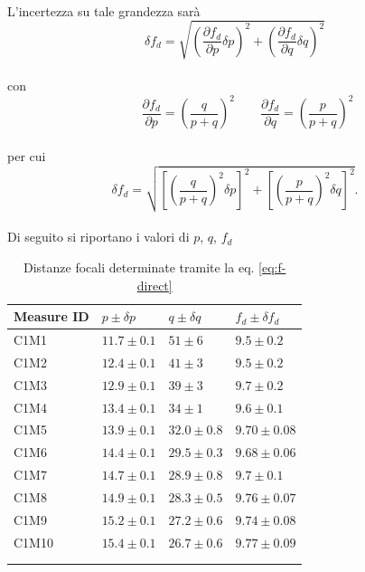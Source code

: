 \documentclass[11pt,a4paper]{article}
\begin{document}
\\
L'incertezza su tale grandezza sarà 
\\
\begin{equation}
    \delta f_d=\sqrt{\left(\frac{\partial f_d}{\partial p} \delta p\right)^2+\left(\frac{\partial f_d}{\partial q} \delta q\right)^2}
\end{equation}
\\
con
\\
\begin{equation}
    \qquad{\frac{\partial f_d}{\partial p}=\left(\frac{q}{p+q}\right)^2}
    \qquad{\frac{\partial f_d}{\partial q}=\left(\frac{p}{p+q}\right)^2}
\end{equation}
\\
per cui
\\
\begin{equation}
    \delta f_d=\sqrt{\left[\left(\frac{q}{p+q}\right)^2 \delta p\right]^2+\left[\left(\frac{p}{p+q}\right)^2 \delta q\right]^2}.
\end{equation}
\\
Di seguito si riportano i valori di $p$, $q$, $f_d$
\\
\begin{longtable}{@{}llll@{}}
\toprule
Measure ID & $p \pm \delta p$ & $q \pm \delta q$ & $f_d \pm \delta f_d$ \tabularnewline
\midrule
C1M1 & $11.7 \pm 0.1$ & $51 \pm 6$ & $9.5 \pm 0.2$ \tabularnewline
C1M2 & $12.4 \pm 0.1$ & $41 \pm 3$ & $9.5 \pm 0.2$ \tabularnewline
C1M3 & $12.9 \pm 0.1$ & $39 \pm 3$ & $9.7 \pm 0.2$ \tabularnewline
C1M4 & $13.4 \pm 0.1$ & $34 \pm 1$ & $9.6 \pm 0.1$ \tabularnewline
C1M5 & $13.9 \pm 0.1$ & $32.0 \pm 0.8$ & $9.70 \pm 0.08$ \tabularnewline
C1M6 & $14.4 \pm 0.1$ & $29.5 \pm 0.3$ & $9.68 \pm 0.06$ \tabularnewline
C1M7 & $14.7 \pm 0.1$ & $28.9 \pm 0.8$ & $9.7 \pm 0.1$ \tabularnewline
C1M8 & $14.9 \pm 0.1$ & $28.3 \pm 0.5$ & $9.76 \pm 0.07$ \tabularnewline
C1M9 & $15.2 \pm 0.1$ & $27.2 \pm 0.6$ & $9.74 \pm 0.08$ \tabularnewline
C1M10 & $15.4 \pm 0.1$ & $26.7 \pm 0.6$ & $9.77 \pm 0.09$ \tabularnewline
\bottomrule
\label{tab:pqf}
\\
\caption{Distanze focali determinate tramite la eq. \ref{eq:f-direct}}
\end{longtable}
\end{document}
